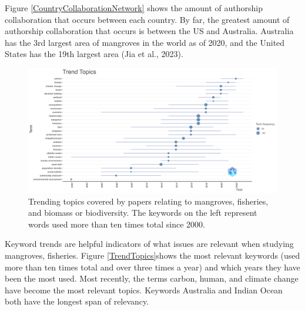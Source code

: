 \documentclass[
  12pt,
]{article}
\begin{document}
Figure \ref{CountryCollaborationNetwork} shows the amount of authorship collaboration that occurs between each country. By far, the greatest amount of authorship collaboration that occurs is between the US and Australia. Australia has the 3rd largest area of mangroves in the world as of 2020, and the United States has the 19th largest area (Jia et al., 2023).

\begin{figure}
\includegraphics[width=1\linewidth]{TrendTopics} \caption{Trending topics covered by papers relating to mangroves, fisheries, and biomass or biodiversity. The keywords on the left represent words used more than ten times total since 2000. \label{TrendTopics}}\label{fig:TrendTopics}
\end{figure}



Keyword trends are helpful indicators of what issues are relevant when studying mangroves, fisheries. Figure \ref{TrendTopics}shows the most relevant keywords (used more than ten times total and over three times a year) and which years they have been the most used. Most recently, the terms carbon, human, and climate change have become the most relevant topics. Keywords Australia and Indian Ocean both have the longest span of relevancy.

\newpage
\end{document}
